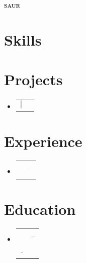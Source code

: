 \documentclass[letterpaper,11pt]{article}
\makeatletter
\newcommand{\resumeSubheading}[4]{
  \vspace{-2pt}\item
    \begin{tabular*}{0.97\textwidth}{l@{\extracolsep{\fill}}r}
      \textbf{#1} & #2 \\
      \textit{#3} & \textit{#4} \\
    \end{tabular*}\vspace{-7pt}
}
\newcommand{\resumeProjectHeading}[2]{
  \item
    \begin{tabular*}{0.97\textwidth}{l@{\extracolsep{\fill}}r}
      {#1} & #2 \\
    \end{tabular*}\vspace{-7pt}
}
\newcommand{\resumeSubHeadingListStart}{\begin{itemize}[leftmargin=0.15in, label={}]}
\newcommand{\resumeSubHeadingListEnd}{\end{itemize}}
\makeatother
\begin{document}
\begin{center}
  \textbf{\Huge \scshape saur} \\ \vspace{3pt}
  
  
  
  
\end{center}

\section{Skills}
\begin{itemize}[leftmargin=0.15in, label={}]
  
  
  
  
  
\end{itemize}

\section{Projects}
\resumeSubHeadingListStart

  \resumeProjectHeading
    {\textbf{}  $|$ \emph{}}{}
    

\resumeSubHeadingListEnd

\section{Experience}
\resumeSubHeadingListStart

  \resumeSubheading
    {}{--}
    {}{}
    

\resumeSubHeadingListEnd

\section{Education}
\resumeSubHeadingListStart

  \resumeSubheading
    {}{--}
    {-}{}

\resumeSubHeadingListEnd
\end{document}
